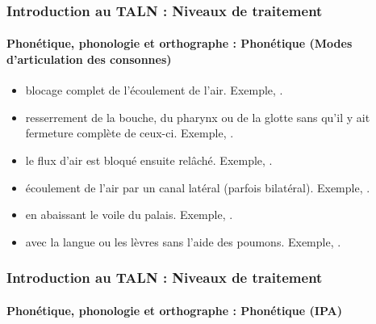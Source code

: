 \documentclass[xcolor=table]{beamer}
\begin{document}
\begin{frame}
\frametitle{Introduction au TALN : Niveaux de traitement}
\framesubtitle{Phonétique, phonologie et orthographe : Phonétique (Modes d'articulation des consonnes)}

\begin{itemize}
	\item {} blocage complet de l'écoulement de l'air.
	Exemple, \expword{\textipa{[p], [k], [b], [m], [n]}}.
	
	\item {} resserrement de la bouche, du pharynx ou de la glotte sans qu'il y ait fermeture complète de ceux-ci.
	Exemple, \expword{\textipa{[f], [v], [s]}}.
	
	\item {} le flux d'air est bloqué ensuite relâché.
	Exemple, \expword{\textipa{[\t{\textteshlig}]}}.
	
	\item {} écoulement de l'air par un canal latéral (parfois bilatéral).
	Exemple, \expword{\textipa{[l]}}.
	
	\item {} en abaissant le voile du palais.
	Exemple, \expword{\textipa{[m], [n]}}.
	
	\item {} avec la langue ou les lèvres sans l'aide des poumons.
	Exemple, .
	
\end{itemize}

\end{frame}

\begin{frame}
\frametitle{Introduction au TALN : Niveaux de traitement}
\framesubtitle{Phonétique, phonologie et orthographe : Phonétique (IPA)}

\begin{center}
\end{center}

\end{frame}
\end{document}
